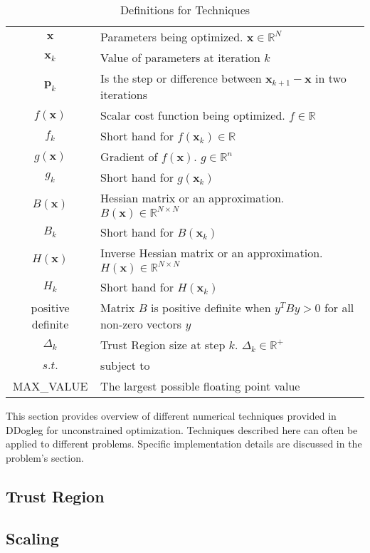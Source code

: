 \documentclass[peerreview,compsoc,onecolumn]{IEEEtran}
\newcommand{\R}{\mathbb{R}}
\begin{document}
\begin{table}[h]
\centering
\caption{\label{definitions:Techniques}Definitions for Techniques}
\begin{tabular}{cl}
$\bm{x}$ & Parameters being optimized. $\bm{x} \in \R^N$ \\
$\bm{x}_k$ & Value of parameters at iteration $k$ \\
$\bm{p}_k$ & Is the step or difference between $\bm{x}_{k+1}-\bm{x}$ in two iterations \\
$f(\bm{x})$ & Scalar cost function being optimized. $f \in \R$ \\
$f_k$ & Short hand for $f(\bm{x}_k) \in \R $ \\
$g(\bm{x})$ & Gradient of $f(\bm{x})$. $g \in \R^n$ \\
$g_k$ & Short hand for $g(\bm{x}_k)$ \\
$B(\bm{x})$ & Hessian matrix or an approximation. $B(\bm{x}) \in \R^{N \times N}$ \\ 
$B_k$ & Short hand for $B(\bm{x}_k)$ \\
$H(\bm{x})$ & Inverse Hessian matrix or an approximation. $H(\bm{x}) \in \R^{N \times N}$  \\ 
$H_k$ & Short hand for $H(\bm{x}_k)$ \\
positive definite & Matrix $B$ is positive definite when $y^T B y > 0$ for all non-zero vectors $y$  \\
$\Delta_k$ & Trust Region size at step $k$. $\Delta_k \in \R^{+}$\\
$s.t.$ & subject to  \\
MAX\_VALUE & The largest possible floating point value
\end{tabular}
\end{table}

This section provides overview of different numerical techniques provided in DDogleg for unconstrained optimization. Techniques described here can often be applied to different problems. Specific implementation details are discussed in the problem's section.

\subsection{Trust Region}



\subsection{Scaling}
\end{document}
